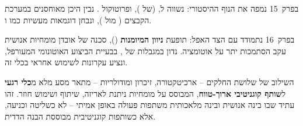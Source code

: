 בפרק~\num{15} נמפה את הנוף ההיסטורי: נשווה  ל,  (של ), ופרוטוקול . נבין היכן מאוחסנים  במערכת הקבצים ( מול ), ונבחן דוגמאות מעשיות כמו  ו.

בפרק~\num{16} נתמודד עם הצד האפל: תופעת \textbf{ניוון המיומנות} (), סכנה של אובדן מומחיות אנושית עקב הסתמכות יתר על אוטומציה. נדון במגבלות של , בבעיית הביצוע האוטונומי המעורפל, ונציע עקרונות לשימוש אחראי בכלי זה.

השילוב של שלושת החלקים – ארכיטקטורה, זיכרון ומודולריות – מתאר מסע מלא מ\textbf{כלי רגעי} ל\textbf{שותף קוגניטיבי ארוך-טווח}, המבוסס על מומחיות ניתנת לאריזה, שיתוף ושימוש חוזר. זהו עתיד שבו בינה אנושית ובינה מלאכותית משתפות פעולה באופן אמיתי – לא כשליטה וכניעה, אלא כשותפות קוגניטיבית מבוססת הבנה הדדית.
